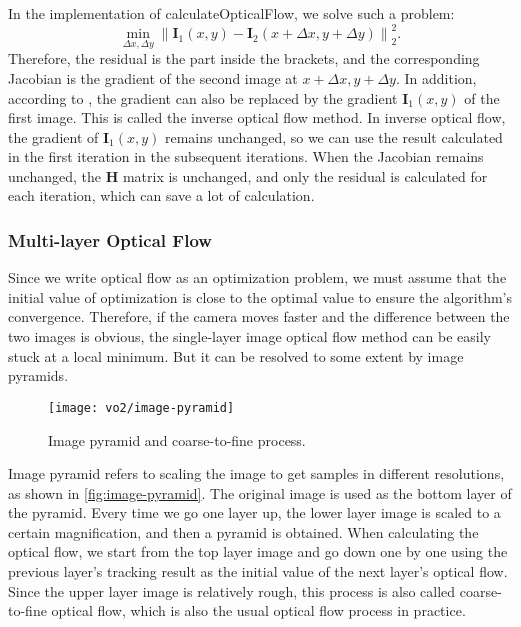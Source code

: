 In the implementation of calculateOpticalFlow, we solve such a problem:
\begin{equation}
\mathop {\min }\limits_{\Delta x,\Delta y} \left\| {{\mathbf{I}_1}\left( {x,y} \right) - {\mathbf{I}_2}\left( {x + \Delta x,y + \Delta y} \right)} \right\|_2^2.
\end{equation}
Therefore, the residual is the part inside the brackets, and the corresponding Jacobian is the gradient of the second image at $x + \Delta x,y + \Delta y$. In addition, according to \cite{Baker2004}, the gradient can also be replaced by the gradient $\mathbf{I}_1 (x,y)$ of the first image. This is called the inverse optical flow method. In inverse optical flow, the gradient of $\mathbf{I}_1 (x,y)$ remains unchanged, so we can use the result calculated in the first iteration in the subsequent iterations. When the Jacobian remains unchanged, the $\mathbf{H}$ matrix is unchanged, and only the residual is calculated for each iteration, which can save a lot of calculation.

\subsubsection{Multi-layer Optical Flow}
Since we write optical flow as an optimization problem, we must assume that the initial value of optimization is close to the optimal value to ensure the algorithm's convergence. Therefore, if the camera moves faster and the difference between the two images is obvious, the single-layer image optical flow method can be easily stuck at a local minimum. But it can be resolved to some extent by image pyramids.

\begin{figure}[!htp]
	\centering
	\texttt{[image: vo2/image-pyramid]}
	\caption{Image pyramid and coarse-to-fine process.}
	\label{fig:image-pyramid}
\end{figure}

Image pyramid refers to scaling the image to get samples in different resolutions, as shown in \autoref{fig:image-pyramid}. The original image is used as the bottom layer of the pyramid. Every time we go one layer up, the lower layer image is scaled to a certain magnification, and then a pyramid is obtained. When calculating the optical flow, we start from the top layer image and go down one by one using the previous layer's tracking result as the initial value of the next layer's optical flow. Since the upper layer image is relatively rough, this process is also called coarse-to-fine optical flow, which is also the usual optical flow process in practice.

